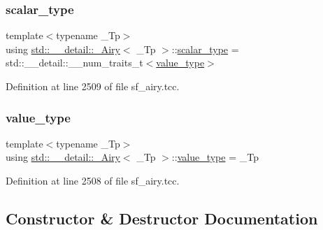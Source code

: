 \subsubsection{\texorpdfstring{scalar\+\_\+type}{scalar\_type}}
{\footnotesize\ttfamily template$<$typename \+\_\+\+Tp$>$ \\
using \hyperlink{classstd_1_1____detail_1_1__Airy}{std\+::\+\_\+\+\_\+detail\+::\+\_\+\+Airy}$<$ \+\_\+\+Tp $>$\+::\hyperlink{classstd_1_1____detail_1_1__Airy_a266cdfcc86b36c8743fd0e102387e1f0}{scalar\+\_\+type} =  std\+::\+\_\+\+\_\+detail\+::\+\_\+\+\_\+num\+\_\+traits\+\_\+t$<$\hyperlink{classstd_1_1____detail_1_1__Airy_a99e7e546930fbd7a846f6933a9b4b437}{value\+\_\+type}$>$}



Definition at line 2509 of file sf\+\_\+airy.\+tcc.

\mbox{\label{classstd_1_1____detail_1_1__Airy_a99e7e546930fbd7a846f6933a9b4b437}} 
\subsubsection{\texorpdfstring{value\+\_\+type}{value\_type}}
{\footnotesize\ttfamily template$<$typename \+\_\+\+Tp$>$ \\
using \hyperlink{classstd_1_1____detail_1_1__Airy}{std\+::\+\_\+\+\_\+detail\+::\+\_\+\+Airy}$<$ \+\_\+\+Tp $>$\+::\hyperlink{classstd_1_1____detail_1_1__Airy_a99e7e546930fbd7a846f6933a9b4b437}{value\+\_\+type} =  \+\_\+\+Tp}



Definition at line 2508 of file sf\+\_\+airy.\+tcc.



\subsection{Constructor \& Destructor Documentation}
\mbox{\label{classstd_1_1____detail_1_1__Airy_a7f9ac77b331e5fdf275923c66d833954}} 
